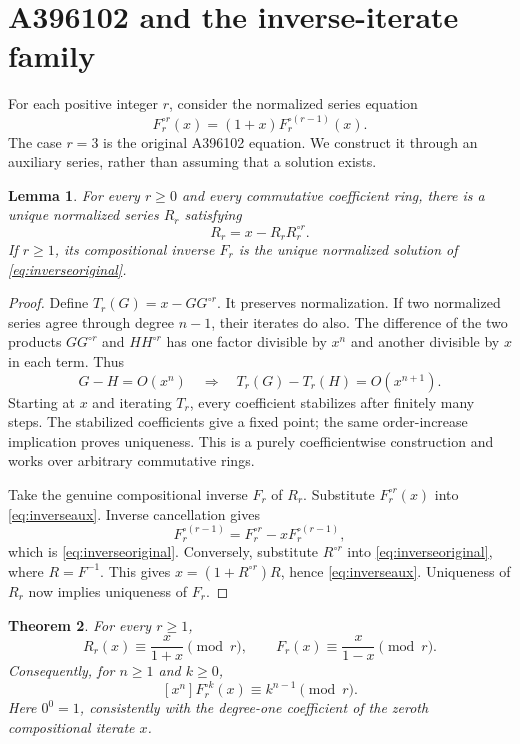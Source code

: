 \documentclass[11pt,a4paper]{article}
\newtheorem{theorem}{Theorem}[section]
\newtheorem{lemma}[theorem]{Lemma}
\theoremstyle{remark}
\begin{document}
\section{A396102 and the inverse-iterate family}

For each positive integer $r$, consider the normalized series equation
\begin{equation}\label{eq:inverseoriginal}
F_r^{\circ r}(x)=(1+x)F_r^{\circ(r-1)}(x).
\end{equation}
The case $r=3$ is the original A396102 equation. We construct it through
an auxiliary series, rather than assuming that a solution exists.

\begin{lemma}\label{lem:inverseconstruct}
For every $r\ge0$ and every commutative coefficient ring, there is a
unique normalized series $R_r$ satisfying
\begin{equation}\label{eq:inverseaux}
R_r=x-R_r R_r^{\circ r}.
\end{equation}
If $r\ge1$, its compositional inverse $F_r$ is the unique normalized
solution of \eqref{eq:inverseoriginal}.
\end{lemma}

\begin{proof}
Define $T_r(G)=x-GG^{\circ r}$. It preserves normalization. If two
normalized series agree through degree $n-1$, their iterates do also.
The difference of the two products $GG^{\circ r}$ and $HH^{\circ r}$
has one factor divisible by $x^n$ and another divisible by $x$ in
each term. Thus
\[
G-H=O(x^n)\quad\Longrightarrow\quad
T_r(G)-T_r(H)=O(x^{n+1}).
\]
Starting at $x$ and iterating $T_r$, every coefficient stabilizes after
finitely many steps. The stabilized coefficients give a fixed point;
the same order-increase implication proves uniqueness. This is a
purely coefficientwise construction and works over arbitrary
commutative rings.

Take the genuine compositional inverse $F_r$ of $R_r$. Substitute
$F_r^{\circ r}(x)$ into \eqref{eq:inverseaux}. Inverse cancellation
gives
\[
F_r^{\circ(r-1)}=F_r^{\circ r}-xF_r^{\circ(r-1)},
\]
which is \eqref{eq:inverseoriginal}. Conversely, substitute
$R^{\circ r}$ into \eqref{eq:inverseoriginal}, where $R=F^{-1}$.
This gives $x=(1+R^{\circ r})R$, hence \eqref{eq:inverseaux}.
Uniqueness of $R_r$ now implies uniqueness of $F_r$.
\end{proof}

\begin{theorem}\label{thm:inversemod}
For every $r\ge1$,
\[
R_r(x)\equiv\frac{x}{1+x}\pmod r,\qquad
F_r(x)\equiv\frac{x}{1-x}\pmod r.
\]
Consequently, for $n\ge1$ and $k\ge0$,
\begin{equation}\label{eq:iteratemod}
[x^n]F_r^{\circ k}(x)\equiv k^{n-1}\pmod r.
\end{equation}
Here $0^0=1$, consistently with the degree-one coefficient of the
zeroth compositional iterate $x$.
\end{theorem}
\end{document}
